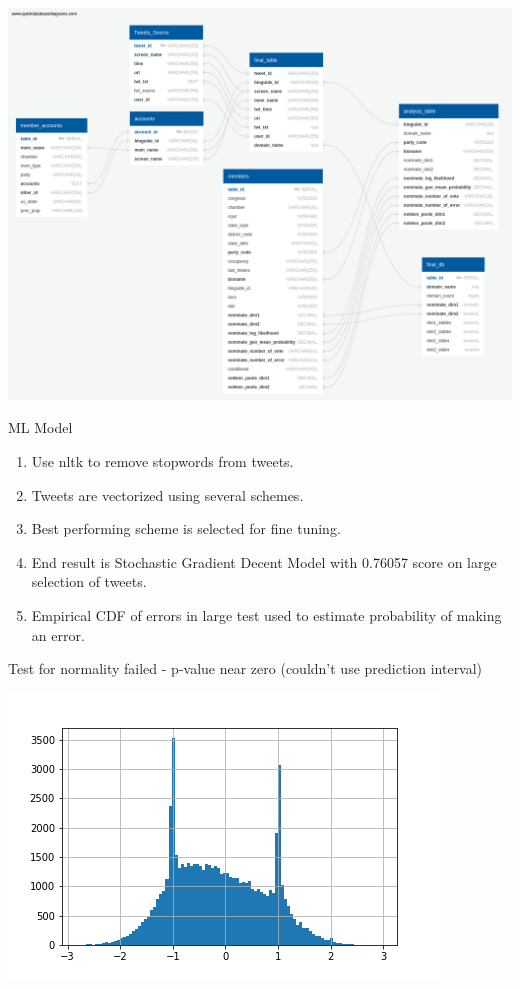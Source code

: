 \documentclass[12pt]{article}
\theoremstyle{example}
\theoremstyle{defn}
\begin{document}
\hspace*{\fill}
\includegraphics[scale=0.13]{QuickDBD-Media_Bias_DB.png}
\hspace*{\fill}

\clearpage

ML Model

\vspace*{-10pt}
\begin{enumerate}
\item Use nltk to remove stopwords from tweets.
\item Tweets are vectorized using several schemes.
\item Best performing scheme is selected for fine tuning.
\item End result is Stochastic Gradient Decent Model with 0.76057 score on large selection of tweets.
\item Empirical CDF of errors in large test used to estimate probability of making an error.
\end{enumerate}

\clearpage

Test for normality failed - p-value near zero (couldn't use prediction interval)

\hspace*{\fill}
\includegraphics[scale=0.45]{histogram.png}
\hspace*{\fill}
\end{document}
